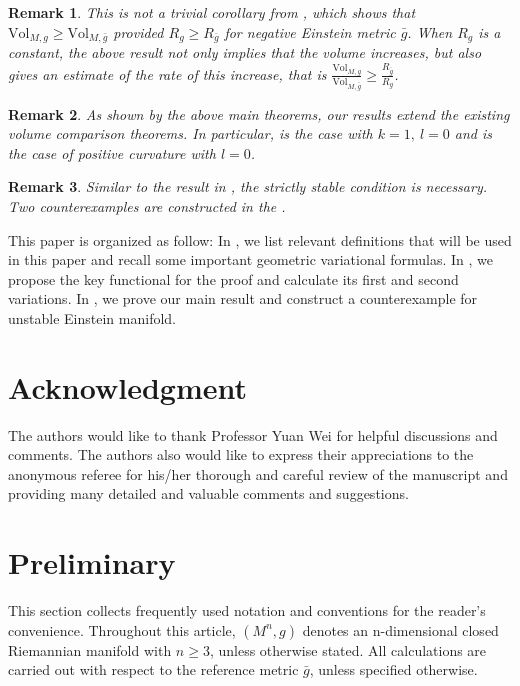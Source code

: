\documentclass[12pt]{amsart}
\newtheorem{remark}{Remark}[section]
\newcommand{\bg}{\bar{g}}
\numberwithin{equation}{section}
\begin{document}
\begin{remark}
    This is not a trivial corollary from , which shows that $\mathrm{Vol}_{M,g}\geq\mathrm{Vol}_{M,\bg}$ provided $R_g\geq R_{\bg}$ for negative Einstein metric $\bg$. When $R_g$ is a constant, the above result not only implies that the volume increases, but also gives an estimate of the rate of this increase, that is $\frac{\mathrm{Vol}_{M,g}}{\mathrm{Vol}_{M,\bg}}\geq\frac{R_{\bg}}{R_{g}}$.
\end{remark}

\begin{remark}
    As shown by the above main theorems, our results extend the existing volume comparison theorems. In particular,  is the case with $k=1,\ l=0$ and  is the case of positive curvature with $l=0$.
\end{remark}

\begin{remark}
    Similar to the result in \cite{Yuan_VolumeCW,Yuan_Q2,2025Volume}, the strictly stable condition is necessary. Two counterexamples are constructed in the .
\end{remark}

This paper is organized as follow: In , we list relevant definitions that will be used in this paper and recall some important geometric variational formulas. In , we propose the key functional for the proof and calculate its first and second variations. In , we prove our main result and construct a counterexample for unstable Einstein manifold.

\section*{\bfseries Acknowledgment}
The authors would like to thank Professor Yuan Wei for helpful discussions and comments. The authors also would like to express their appreciations to the  anonymous referee for his/her thorough and careful review of the manuscript and providing many detailed and valuable comments and suggestions.


\section{Preliminary}\label{Section: 2}
This section collects frequently used notation and conventions for the reader's convenience. Throughout this article, $(M^n, g)$ denotes an n-dimensional closed Riemannian manifold with $n \geq 3$, unless otherwise stated. All calculations are carried out with respect to the reference metric $\bg$, unless specified otherwise.
\end{document}

